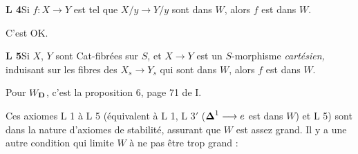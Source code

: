 \textbf{L 4}\enspace Si $f : X \longrightarrow Y$ est tel que $X/y \longrightarrow Y/y$ sont dans $W$, alors $f$ est dans $W$.

C’est OK.

\textbf{L 5}\enspace Si $X$, $Y$ sont Cat-fibrées sur $S$, et $X \longrightarrow Y$ est un $S$-morphisme \textit{cartésien,} induisant sur les fibres des $X_s \longrightarrow Y_s$ qui sont dans $W$, alors $f$ est dans $W$.

Pour $W_{\mathbf{D}}$, c’est la proposition 6, page 71 de I.

Ces axiomes L 1 à L 5 (équivalent à L 1, L 3$'$ ($\boldsymbol{\Delta}^1 \longrightarrow e$ est dans $W$) et L 5) sont dans la nature d’axiomes de stabilité, assurant que $W$ est assez grand. Il y a une autre condition qui limite $W$ à ne pas être trop grand :

